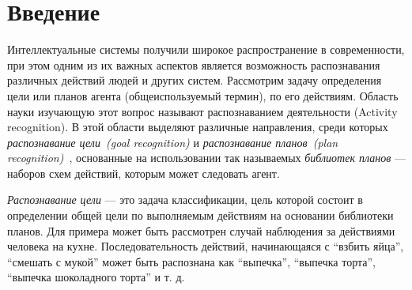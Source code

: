 \documentclass[14pt]{matmex-diploma-custom}
\begin{document}
	\renewcommand{\lstlistingname}{Листинг}

	
	\maketitle
	\tableofcontents
	\section*{Введение}
	Интеллектуальные системы получили широкое распространение в современности,
	при этом одним из их важных аспектов является возможность распознавания различных действий людей и других систем.
    Рассмотрим задачу определения цели или планов агента (общеиспользуемый термин), по его действиям. Область науки изучающую 
    этот вопрос называют распознаванием деятельности (Activity recognition). В этой области выделяют различные направления, среди которых
    \textit{распознавание цели~(goal recognition)} и \textit{распознавание планов~(plan recognition)}~\cite{mirsky2017slim},
	основанные на использовании так называемых \textit{библиотек планов} --- наборов схем действий, которым может следовать агент.
    
    \textit{Распознавание цели} --- это задача классификации, цель которой состоит в определении общей цели по выполняемым действиям на основании библиотеки планов.
	Для примера может быть рассмотрен случай наблюдения за действиями человека на кухне. Последовательность действий, начинающаяся
	с ``взбить яйца'', ``смешать с мукой'' может быть распознана как ``выпечка'', ``выпечка торта'', ``выпечка шоколадного торта'' и т. д.
	
\end{document}
